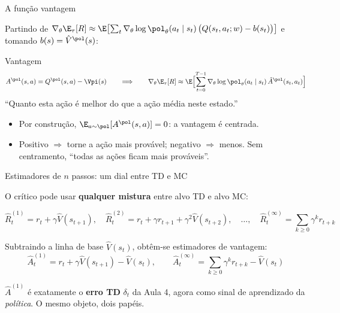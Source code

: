 \documentclass[aspectratio=169, 11pt]{beamer}
\newcommand{\thv}{\theta}                       %
\newcommand{\wv}{w}                             %
\newcommand{\polth}{\pol_{\thv}}                %
\newcommand{\gth}{\nabla_{\thv}}                %
\newcommand{\traj}{\tau}                        %
\newcommand{\Vhat}{\hat{V}}
\newcommand{\Ahat}{\hat{A}}
\newcommand{\Advpi}{A^{\pol}}
\begin{document}
\begin{frame}{A função vantagem}

  Partindo de
  $\gth \E_\traj[R] \approx \E\bigl[\sum_t \gth\log\polth(a_t\mid s_t)\,
   \bigl(Q(s_t,a_t;\wv) - b(s_t)\bigr)\bigr]$
  e tomando $b(s) = \Vhat^{\pol}(s)$:

  \begin{defbox}{Vantagem}
    \[
      \Advpi(s,a) = Q^{\pol}(s,a) - \Vpi(s)
      \qquad\Longrightarrow\qquad
      \gth \E_\traj[R] \approx \E\Bigl[\sum_{t=0}^{T-1}
        \gth \log \polth(a_t\mid s_t)\, \Ahat^{\pol}(s_t,a_t)\Bigr]
    \]
    ``Quanto esta ação é melhor do que a ação média neste estado.''
  \end{defbox}

  \begin{itemize}\setlength{\itemsep}{0.3ex}
    \item Por construção, $\E_{a\sim\pol}[\Advpi(s,a)] = 0$: a vantagem é
      centrada.
    \item Positivo $\Rightarrow$ torne a ação mais provável; negativo
      $\Rightarrow$ menos. Sem centramento, ``todas as ações ficam mais
      prováveis''.
  \end{itemize}
\end{frame}

\begin{frame}{Estimadores de $n$ passos: um dial entre TD e MC}

  O crítico pode usar \textbf{qualquer mistura} entre alvo TD e alvo MC:

  \[
    \hat{R}^{(1)}_t = r_t + \gamma \Vhat(s_{t+1}),
    \quad
    \hat{R}^{(2)}_t = r_t + \gamma r_{t+1} + \gamma^2 \Vhat(s_{t+2}),
    \quad \dots, \quad
    \hat{R}^{(\infty)}_t = \sum_{k\ge 0}\gamma^k r_{t+k}
  \]

  Subtraindo a linha de base $\Vhat(s_t)$, obtêm-se estimadores de vantagem:
  \[
    \Ahat^{(1)}_t = r_t + \gamma \Vhat(s_{t+1}) - \Vhat(s_t),
    \qquad
    \Ahat^{(\infty)}_t = \sum_{k\ge 0}\gamma^k r_{t+k} - \Vhat(s_t)
  \]

  \begin{ideiabox}
    $\Ahat^{(1)}$ é exatamente o \textbf{erro TD} $\delta_t$ da Aula 4, agora
    como sinal de aprendizado da \emph{política}. O mesmo objeto, dois papéis.
  \end{ideiabox}
\end{frame}
\end{document}
